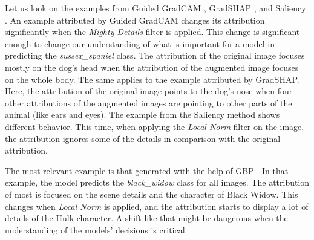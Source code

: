 \vspace{\baselineskip}

Let us look on the examples from Guided GradCAM \cite{selvaraju2017grad}, GradSHAP \cite{erion2019learning}, and Saliency \cite{simonyan2014deep}. An example attributed by Guided GradCAM changes its attribution significantly when the \textit{Mighty Details} filter is applied. This change is significant enough to change our understanding of what is important for a model in predicting the \textit{sussex\_spaniel} class. The attribution of the original image focuses mostly on the dog's head when the attribution of the augmented image focuses on the whole body. The same applies to the example attributed by GradSHAP. Here, the attribution of the original image points to the dog's nose when four other attributions of the augmented images are pointing to other parts of the animal (like ears and eyes). The example from the Saliency method shows different behavior. This time, when applying the \textit{Local Norm} filter on the image, the attribution ignores some of the details in comparison with the original attribution.

\vspace{\baselineskip}

The most relevant example is that generated with the help of GBP \cite{springenberg2014striving}. In that example, the model predicts the \textit{black\_widow} class for all images. The attribution of most is focused on the scene details and the character of Black Widow. This changes when \textit{Local Norm} is applied, and the attribution starts to display a lot of details of the Hulk character. A shift like that might be dangerous when the understanding of the models' decisions is critical.


